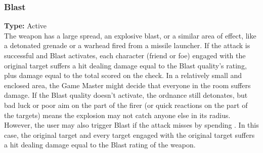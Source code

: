 \subsubsection{Blast}
\label{iqty:blast}
\textbf{Type:} Active\\
The weapon has a large spread, an explosive blast, or
a similar area of effect, like a detonated grenade or a
warhead fired from a missile launcher. If the attack is
successful and Blast activates, each character (friend
or foe) engaged with the original target suffers a hit
dealing damage equal to the Blast quality’s rating, plus
damage equal to the total \success scored on the check.
In a relatively small and enclosed area, the Game Master
might decide that everyone in the room suffers damage.
If the Blast quality doesn’t activate, the ordnance still
detonates, but bad luck or poor aim on the part of the
firer (or quick reactions on the part of the targets) means
the explosion may not catch anyone else in its radius.
However, the user may also trigger Blast if the attack
misses by spending \advantage\advantage\advantage. In
this case, the original target and every target engaged
with the original target suffers a hit dealing damage
equal to the Blast rating of the weapon.
